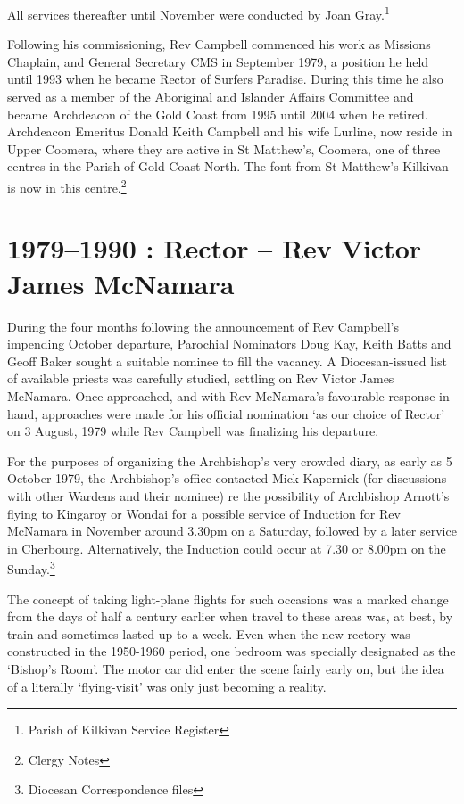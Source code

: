 All services thereafter until November were conducted by Joan
Gray.\footnote{Parish of Kilkivan Service Register}

Following his commissioning, Rev Campbell commenced his work as Missions
Chaplain, and General Secretary CMS in September 1979, a position he
held until 1993 when he became Rector of Surfers Paradise. During this
time he also served as a member of the Aboriginal and Islander Affairs
Committee and became Archdeacon of the Gold Coast from 1995 until 2004
when he retired. Archdeacon Emeritus Donald Keith Campbell and his wife
Lurline, now reside in Upper Coomera, where they are active in St
Matthew's, Coomera, one of three centres in the Parish of Gold Coast
North. The font from St Matthew's Kilkivan is now in this
centre.\footnote{Clergy Notes}

\printendnotes
\setcounter{endnote}{0}
\chapter{1979--1990 : Rector -- Rev Victor James
McNamara}

During the four months following the announcement of Rev Campbell's
impending October departure, Parochial Nominators Doug Kay, Keith Batts
and Geoff Baker sought a suitable nominee to fill the vacancy. A
Diocesan-issued list of available priests was carefully studied,
settling on Rev Victor James McNamara. Once approached, and with Rev
McNamara's favourable response in hand, approaches were made for his
official nomination `as our choice of Rector' on 3 August, 1979 while
Rev Campbell was finalizing his departure.

For the purposes of organizing the Archbishop's very crowded diary, as
early as 5 October 1979, the Archbishop's office contacted Mick
Kapernick (for discussions with other Wardens and their nominee) re the
possibility of Archbishop Arnott's flying to Kingaroy or Wondai for a
possible service of Induction for Rev McNamara in November around 3.30pm
on a Saturday, followed by a later service in Cherbourg. Alternatively,
the Induction could occur at 7.30 or 8.00pm on the Sunday.\footnote{Diocesan
  Correspondence files}

The concept of taking light-plane flights for such occasions was a
marked change from the days of half a century earlier when travel to
these areas was, at best, by train and sometimes lasted up to a week.
Even when the new rectory was constructed in the 1950-1960 period, one
bedroom was specially designated as the `Bishop's Room'. The motor car
did enter the scene fairly early on, but the idea of a literally
`flying-visit' was only just becoming a reality.

